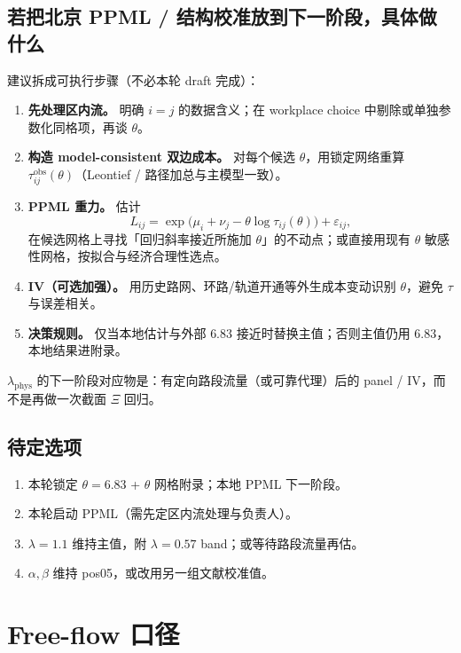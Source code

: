\documentclass[11pt,a4paper]{article}
\begin{document}
\subsection*{若把北京 PPML / 结构校准放到下一阶段，具体做什么}
建议拆成可执行步骤（不必本轮 draft 完成）：
\begin{enumerate}[leftmargin=*]
  \item \textbf{先处理区内流。} 明确 $i=j$ 的数据含义；在 workplace choice 中剔除或单独参数化同格项，再谈 $\theta$。
  \item \textbf{构造 model-consistent 双边成本。} 对每个候选 $\theta$，用锁定网络重算 $\tau_{ij}^{\mathrm{obs}}(\theta)$（Leontief / 路径加总与主模型一致）。
  \item \textbf{PPML 重力。} 估计
  \[
    L_{ij}=\exp\bigl(\mu_i+\nu_j-\theta\log\tau_{ij}(\theta)\bigr)+\varepsilon_{ij},
  \]
  在候选网格上寻找「回归斜率接近所施加 $\theta$」的不动点；或直接用现有 $\theta$ 敏感性网格，按拟合与经济合理性选点。
  \item \textbf{IV（可选加强）。} 用历史路网、环路/轨道开通等外生成本变动识别 $\theta$，避免 $\tau$ 与误差相关。
  \item \textbf{决策规则。} 仅当本地估计与外部 $6.83$ 接近时替换主值；否则主值仍用 $6.83$，本地结果进附录。
\end{enumerate}
$\lambda_{\mathrm{phys}}$ 的下一阶段对应物是：有定向路段流量（或可靠代理）后的 panel / IV，而不是再做一次截面 $\Xi$ 回归。

\subsection*{待定选项}
\begin{enumerate}[nosep]
  \item 本轮锁定 $\theta=6.83$ + $\theta$ 网格附录；本地 PPML 下一阶段。
  \item 本轮启动 PPML（需先定区内流处理与负责人）。
  \item $\lambda=1.1$ 维持主值，附 $\lambda=0.57$ band；或等待路段流量再估。
  \item $\alpha,\beta$ 维持 pos05，或改用另一组文献校准值。
\end{enumerate}

\section{Free-flow 口径}
\end{document}
